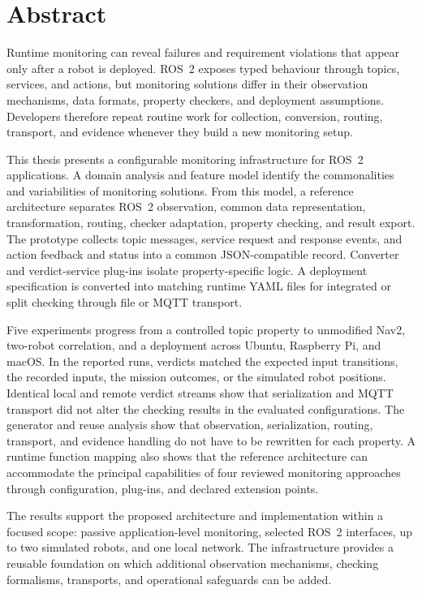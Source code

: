 \chapter*{Abstract}

Runtime monitoring can reveal failures and requirement violations that appear
only after a robot is deployed. ROS~2 exposes typed behaviour through topics,
services, and actions, but monitoring solutions differ in their observation
mechanisms, data formats, property checkers, and deployment assumptions.
Developers therefore repeat routine work for collection, conversion, routing,
transport, and evidence whenever they build a new monitoring setup.

This thesis presents a configurable monitoring infrastructure for ROS~2
applications. A domain analysis and feature model identify the commonalities and
variabilities of monitoring solutions. From this model, a reference architecture
separates ROS~2 observation, common data representation, transformation,
routing, checker adaptation, property checking, and result export. The
prototype collects topic messages, service request and response events, and
action feedback and status into a common JSON-compatible record. Converter and
verdict-service plug-ins isolate property-specific logic. A deployment
specification is converted into matching runtime YAML files for integrated or
split checking through file or MQTT transport.

Five experiments progress from a controlled topic property to unmodified Nav2,
two-robot correlation, and a deployment across Ubuntu, Raspberry Pi, and macOS.
In the reported runs, verdicts matched the expected input transitions, the
recorded inputs, the mission outcomes, or the simulated robot
positions. Identical local and remote verdict streams show that serialization
and MQTT transport did not alter the checking results in the evaluated
configurations. The generator and reuse analysis show that
observation, serialization, routing, transport, and evidence handling do not
have to be rewritten for each property. A runtime function mapping
also shows that the reference architecture can accommodate the principal
capabilities of four reviewed monitoring approaches through configuration,
plug-ins, and declared extension points.

The results support the proposed architecture and implementation within a
focused scope: passive application-level monitoring, selected ROS~2 interfaces,
up to two simulated robots, and one local network. The infrastructure provides a
reusable foundation on which additional observation mechanisms, checking
formalisms, transports, and operational safeguards can be added.
